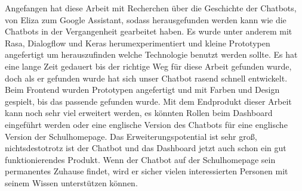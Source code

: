 Angefangen hat diese Arbeit mit Recherchen über die Geschichte der Chatbots, von Eliza zum Google Assistant, sodass herausgefunden werden kann wie die Chatbots in der Vergangenheit gearbeitet haben.
Es wurde unter anderem mit Rasa, Dialogflow und Keras herumexperimentiert und kleine Prototypen angefertigt um herauszufinden welche Technologie benutzt werden sollte.
Es hat eine lange Zeit gedauert bis der richtige Weg für diese Arbeit gefunden wurde, doch als er gefunden wurde hat sich unser Chatbot rasend schnell entwickelt.
Beim Frontend wurden Prototypen angefertigt und mit Farben und Design gespielt, bis das passende gefunden wurde.
Mit dem Endprodukt dieser Arbeit kann noch sehr viel erweitert werden, es könnten Rollen beim Dashboard eingeführt werden oder eine englische Version des Chatbots für eine englische Version der Schulhomepage.
Das Erweiterungspotential ist sehr groß, nichtsdestotrotz ist der Chatbot und das Dashboard jetzt auch schon ein gut funktionierendes Produkt.
Wenn der Chatbot auf der Schulhomepage sein permanentes Zuhause findet, wird er sicher vielen interessierten Personen mit seinem Wissen unterstützen können.
